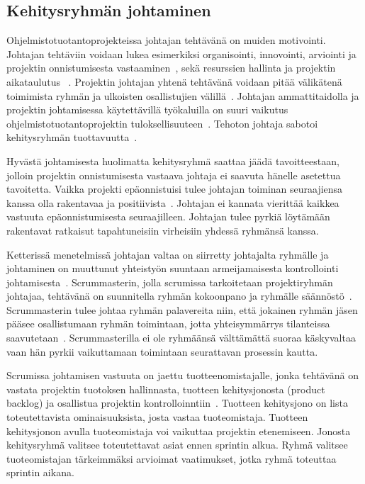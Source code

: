 \documentclass[finnish]{tktltiki2}
\theoremstyle{definition}
\theoremstyle{remark}
\begin{document}
\subsection{Kehitysryhmän johtaminen}

Ohjelmistotuotantoprojekteissa johtajan tehtävänä on muiden motivointi. Johtajan tehtäviin voidaan lukea esimerkiksi organisointi, innovointi, arviointi ja projektin onnistumisesta vastaaminen~\cite{4017705}, sekä resurssien hallinta ja projektin aikataulutus ~\cite{Dhomne:2012:ITL:2382887.2382899}. Projektin johtajan yhtenä tehtävänä voidaan pitää välikätenä toimimista ryhmän ja ulkoisten osallistujien välillä~\cite{McLeod:2011:FAS:1978802.1978803}. Johtajan ammattitaidolla ja projektin johtamisessa käytettävillä työkaluilla on suuri vaikutus ohjelmistotuotantoprojektin tuloksellisuuteen~\cite{McLeod:2011:FAS:1978802.1978803}. Tehoton johtaja sabotoi kehitysryhmän tuottavuutta~\cite{bradley1997effect}.

Hyvästä johtamisesta huolimatta kehitysryhmä saattaa jäädä tavoitteestaan, jolloin projektin onnistumisesta vastaava johtaja ei saavuta hänelle asetettua tavoitetta. Vaikka projekti epäonnistuisi tulee johtajan toiminan seuraajiensa kanssa olla rakentavaa ja positiivista~\cite{raccoon2006leadership}. Johtajan ei kannata vierittää kaikkea vastuuta epäonnistumisesta seuraajilleen. Johtajan tulee pyrkiä löytämään rakentavat ratkaisut tapahtuneisiin virheisiin yhdessä ryhmänsä kanssa.

Ketterissä menetelmissä johtajan valtaa on siirretty johtajalta ryhmälle ja johtaminen on muuttunut yhteistyön suuntaan armeijamaisesta kontrollointi johtamisesta~\cite{Nerur:2005:CMA:1060710.1060712}. Scrummasterin, jolla scrumissa tarkoitetaan projektiryhmän johtajaa, tehtävänä on suunnitella ryhmän kokoonpano ja ryhmälle säännöstö~\cite{4755768}. Scrummasterin tulee johtaa ryhmän palavereita niin, että jokainen ryhmän jäsen pääsee osallistumaan ryhmän toimintaan, jotta yhteisymmärrys tilanteissa saavutetaan~\cite{bradley1997effect}. Scrummasterilla ei ole ryhmäänsä välttämättä suoraa käskyvaltaa vaan hän pyrkii vaikuttamaan toimintaan seurattavan prosessin kautta.

Scrumissa johtamisen vastuuta on jaettu tuotteenomistajalle, jonka tehtävänä on vastata projektin tuotoksen hallinnasta, tuotteen kehitysjonosta (product backlog) ja osallistua projektin kontrolloinntiin~\cite{4755768}. Tuotteen kehitysjono on lista toteutettavista ominaisuuksista, josta vastaa tuoteomistaja. Tuotteen kehitysjonon avulla tuoteomistaja voi vaikuttaa projektin etenemiseen. Jonosta kehitysryhmä valitsee toteutettavat asiat ennen sprintin alkua. Ryhmä valitsee tuoteomistajan tärkeimmäksi arvioimat vaatimukset, jotka ryhmä toteuttaa sprintin aikana. 
\end{document}
